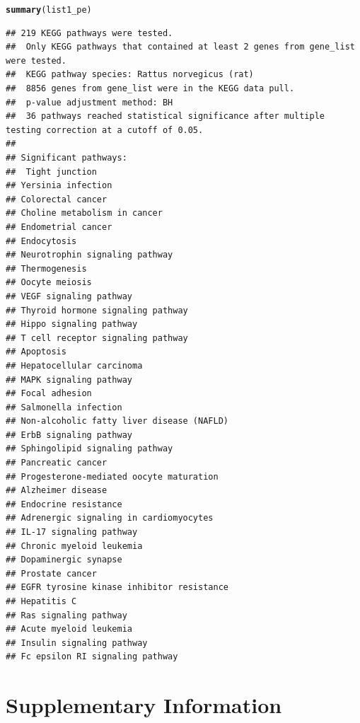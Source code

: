 \documentclass[article]{jss}\usepackage[]{graphicx}\usepackage[]{color}
\makeatletter
\newcommand{\hlstd}[1]{\textcolor[rgb]{0.345,0.345,0.345}{#1}}%
\newcommand{\hlkwd}[1]{\textcolor[rgb]{0.737,0.353,0.396}{\textbf{#1}}}%
\newenvironment{kframe}{%
 \def\at@end@of@kframe{}%
 \ifinner\ifhmode%
  \def\at@end@of@kframe{\end{minipage}}%
  \begin{minipage}{\columnwidth}%
 \fi\fi%
 \def\FrameCommand##1{\hskip\@totalleftmargin \hskip-\fboxsep
 \colorbox{shadecolor}{##1}\hskip-\fboxsep
     \hskip-\linewidth \hskip-\@totalleftmargin \hskip\columnwidth}%
 \MakeFramed {\advance\hsize-\width
   \@totalleftmargin\z@ \linewidth\hsize
   \@setminipage}}%
 {\par\unskip\endMakeFramed%
 \at@end@of@kframe}
\newenvironment{knitrout}{}{} %
\makeatother
\begin{document}
\begin{knitrout}
\color{fgcolor}\begin{kframe}
\begin{alltt}
\hlkwd{summary}\hlstd{(list1_pe)}
\end{alltt}
\begin{verbatim}
## 219 KEGG pathways were tested. 
##  Only KEGG pathways that contained at least 2 genes from gene_list were tested. 
##  KEGG pathway species: Rattus norvegicus (rat)
##  8856 genes from gene_list were in the KEGG data pull. 
##  p-value adjustment method: BH
##  36 pathways reached statistical significance after multiple testing correction at a cutoff of 0.05. 
##  
## Significant pathways: 
##  Tight junction
## Yersinia infection
## Colorectal cancer
## Choline metabolism in cancer
## Endometrial cancer
## Endocytosis
## Neurotrophin signaling pathway
## Thermogenesis
## Oocyte meiosis
## VEGF signaling pathway
## Thyroid hormone signaling pathway
## Hippo signaling pathway
## T cell receptor signaling pathway
## Apoptosis
## Hepatocellular carcinoma
## MAPK signaling pathway
## Focal adhesion
## Salmonella infection
## Non-alcoholic fatty liver disease (NAFLD)
## ErbB signaling pathway
## Sphingolipid signaling pathway
## Pancreatic cancer
## Progesterone-mediated oocyte maturation
## Alzheimer disease
## Endocrine resistance
## Adrenergic signaling in cardiomyocytes
## IL-17 signaling pathway
## Chronic myeloid leukemia
## Dopaminergic synapse
## Prostate cancer
## EGFR tyrosine kinase inhibitor resistance
## Hepatitis C
## Ras signaling pathway
## Acute myeloid leukemia
## Insulin signaling pathway
## Fc epsilon RI signaling pathway
\end{verbatim}
\end{kframe}
\end{knitrout}

\section[Supplementary Information]{Supplementary Information} \label{sec:supinfo}
\end{document}
